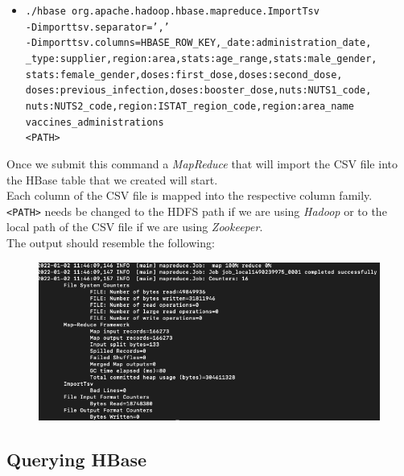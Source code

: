 \documentclass[12pt, a4paper]{article}
\begin{document}
\vfill %

\begin{footnotesize}
  \begin{itemize}
    \item[] \texttt{./hbase org.apache.hadoop.hbase.mapreduce.ImportTsv \\
      -Dimporttsv.separator=',' \\
      -Dimporttsv.columns=HBASE\_ROW\_KEY,\_date:administration\_date, \\
        \_type:supplier,region:area,stats:age\_range,stats:male\_gender, \\
        stats:female\_gender,doses:first\_dose,doses:second\_dose, \\
        doses:previous\_infection,doses:booster\_dose,nuts:NUTS1\_code, \\
        nuts:NUTS2\_code,region:ISTAT\_region\_code,region:area\_name \\
      vaccines\_administrations \\
      <PATH>} 
  \end{itemize}
\end{footnotesize}
Once we submit this command a \emph{MapReduce} that will import the CSV file into the 
HBase table that we created will start. \\
Each column of the CSV file is mapped into the respective column family.  \\
\texttt{<PATH>} needs be changed to the HDFS path if we are using \emph{Hadoop} or to 
the local path of the CSV file if we are using \emph{Zookeeper}. \\
The output should resemble the following: 

\begin{figure}[ht]
  \centering
  \includegraphics[width=\linewidth]{hbase_import.png}
\end{figure}

\subsection{Querying HBase}
\end{document}
